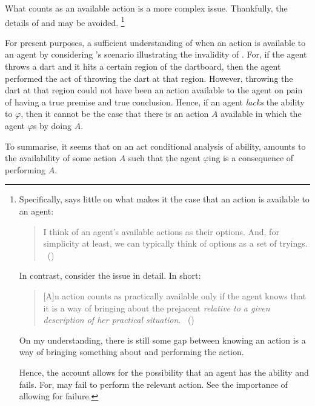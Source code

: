 \begin{note}[Availability]
  What counts as an available action is a more complex issue.
  Thankfully, the details of \citeauthor{Mandelkern:2017aa} and \citeauthor{Boylan:2020aa} may be avoided.%
  \footnote{
    Specifically, \citeauthor{Boylan:2020aa} says little on what makes it the case that an action is available to an agent:
    \begin{quote}
      I think of an agent's available actions as their options.
      And, for simplicity at least, we can typically think of options as a set of tryings.%
      \mbox{ }\hfill\mbox{(\citeyear[14]{Boylan:2020aa})}
    \end{quote}
    In contrast, \citeauthor{Mandelkern:2017aa} consider the issue in detail.
    In short:
    \begin{quote}
      [A]n action counts as practically available only if the agent knows that it is a way of bringing about the prejacent \emph{relative to a given description of her practical situation}.%
      \mbox{ }\hfill\mbox{(\citeyear[321]{Mandelkern:2017aa})}
    \end{quote}
    On my understanding, there is still some gap between knowing an action is a way of bringing something about and performing the action.

    Hence, the account allows for the possibility that an agent has the ability and fails.
    For, may fail to perform the relevant action.
      See \citeauthor{Maier:2013vk} the importance of allowing for failure.
  }

  For present purposes, a sufficient understanding of when an action is available to an agent by considering \citeauthor{Boylan:2020aa}'s scenario illustrating the invalidity of \BoyVS{}.
  For, if the agent throws a dart and it hits a certain region of the dartboard, then the agent performed the act of throwing the dart at that region.
  However, throwing the dart at that region could not have been an action available to the agent on pain of \BoyVS{} having a true premise and true conclusion.
  Hence, if an agent \emph{lacks} the ability to \(\varphi\), then it cannot be the case that there is an action \(A\) available in which the agent \(\varphi\)s by doing \(A\).
\end{note}

\begin{note}
  To summarise, it seems that on an act conditional analysis of ability, \AbControl{} amounts to the availability of some action \(A\) such that the agent \(\varphi\)ing is a consequence of performing \(A\).
\end{note}


